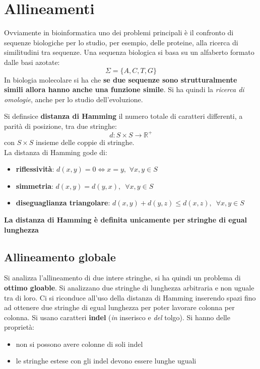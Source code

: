 \documentclass[a4paper,12pt, oneside]{book}
\begin{document}
\chapter{Allineamenti}
Ovviamente in bioinformatica uno dei problemi principali è il
confronto di sequenze biologiche per lo studio, per esempio, delle
proteine, alla ricerca di similitudini tra sequenze. Una sequenza
biologica si basa su un alfaberto formato dalle basi azotate:
\[\Sigma=\{A,C,T,G\}\]
In biologia molecolare si ha che \textbf{se due sequenze sono
  strutturalmente simili allora hanno anche una funzione simile}.
Si ha quindi la \textit{ricerca di omologie}, anche per lo studio
dell'evoluzione.
\begin{definizione}
  Si definsice \textbf{distanza di Hamming} il numero totale di
  caratteri differenti, a parità di posizione, tra due stringhe:
  \[d:S\times S\to\mathbb{R}^+\]
  con $S\times S$ insieme delle coppie di stringhe.\\
  La distanza di Hamming gode di:
  \begin{itemize}
    \item \textbf{riflessività}: $d(x,y)=0\Longleftrightarrow x=y,\,\,\forall
    x,y\in S$
    \item \textbf{simmetria}: $d(x,y)=d(y,x),\,\,\,\forall
    x,y\in S$
    \item \textbf{diseguaglianza triangolare}: $d(x,y)+d(y,z)\leq
    d(x,z),\,\,\,\forall x,y\in S$
  \end{itemize}
  \textbf{La distanza di Hamming è definita unicamente per stringhe di
    egual lunghezza}
\end{definizione}
\newpage

\section{Allineamento globale}
Si analizza l'allineamento di due intere stringhe, si ha quindi un
problema di \textbf{ottimo gloable}. Si analizzano due stringhe di
lunghezza arbitraria e non uguale tra di loro. Ci si riconduce all'uso
della distanza di Hamming inserendo spazi fino ad ottenere due
stringhe di egual lunghezza per poter lavorare colonna per colonna.
Si usano caratteri \textbf{indel} (\textit{in} inserisco e
\textit{del} tolgo). Si hanno delle proprietà:
\begin{itemize}
  \item non si possono avere colonne di soli indel
  \item le stringhe estese con gli indel devono essere lunghe uguali
\end{itemize}
\end{document}
